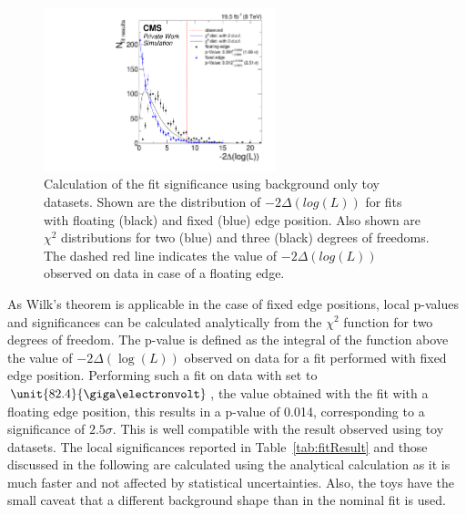 \begin{figure}[htbp]
\centering
  \includegraphics[width=0.6\textwidth]{plots/results/fit/toyResults/significanceStudy_BackgroundOnly.pdf}
\caption{Calculation of the fit significance using background only toy datasets. Shown are the distribution of $-2\Delta(log(L))$ for fits with floating (black) and fixed (blue) edge position. Also shown are $\chi^2$ distributions for two (blue) and three (black) degrees of freedoms. The dashed red line indicates the value of $-2\Delta(log(L))$ observed on data in case of a floating edge.}
\label{fig:fit:toySignif}
\end{figure}

As Wilk's theorem is applicable in the case of fixed edge positions, local p-values and significances can be calculated analytically from the $\chi^2$ function for two degrees of freedom. The p-value is defined as the integral of the function above the value of  $-2\Delta\left(\log\left(L\right)\right)$ observed on data for a fit performed with fixed edge position. Performing such a fit on data with \mlledge set to $\unit{82.4}{\giga\electronvolt}$, the value obtained with the fit with a floating edge position, this results in a p-value of 0.014, corresponding to a significance of $2.5\sigma$. This is well compatible with the result observed using toy datasets. The local significances reported in Table~\ref{tab:fitResult} and those discussed in the following are calculated using the analytical calculation as it is much faster and not affected by statistical uncertainties. Also, the toys have the small caveat that a different background shape than in the nominal fit is used. 


